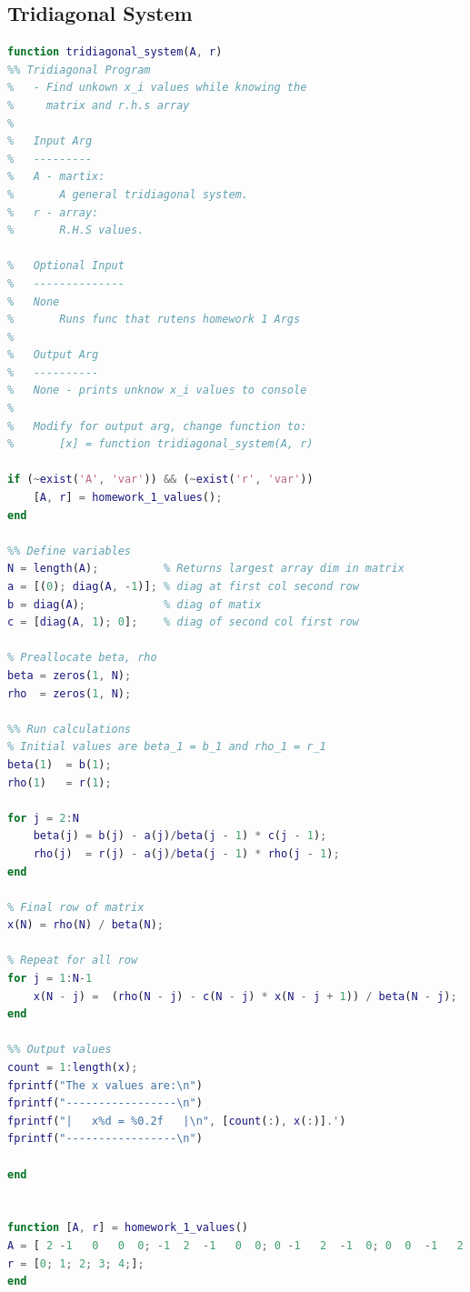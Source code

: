 \documentclass[12pt]{article}
\begin{document}
\subsection*{Tridiagonal System}
\begin{lstlisting}[language=Matlab, caption=Tridiagonal Program]
function tridiagonal_system(A, r)
%% Tridiagonal Program
%   - Find unkown x_i values while knowing the
%     matrix and r.h.s array
%   
%   Input Arg
%   ---------
%   A - martix:
%       A general tridiagonal system.
%   r - array:
%       R.H.S values.

%   Optional Input
%   --------------
%   None
%       Runs func that rutens homework 1 Args
%
%   Output Arg
%   ----------
%   None - prints unknow x_i values to console
%
%   Modify for output arg, change function to:
%       [x] = function tridiagonal_system(A, r)

if (~exist('A', 'var')) && (~exist('r', 'var'))
    [A, r] = homework_1_values(); 
end

%% Define variables   
N = length(A);          % Returns largest array dim in matrix
a = [(0); diag(A, -1)]; % diag at first col second row
b = diag(A);            % diag of matix
c = [diag(A, 1); 0];    % diag of second col first row

% Preallocate beta, rho
beta = zeros(1, N);
rho  = zeros(1, N);

%% Run calculations
% Initial values are beta_1 = b_1 and rho_1 = r_1
beta(1)  = b(1);
rho(1)   = r(1);

for j = 2:N
    beta(j) = b(j) - a(j)/beta(j - 1) * c(j - 1);
    rho(j)  = r(j) - a(j)/beta(j - 1) * rho(j - 1);
end

% Final row of matrix
x(N) = rho(N) / beta(N);

% Repeat for all row
for j = 1:N-1
    x(N - j) =  (rho(N - j) - c(N - j) * x(N - j + 1)) / beta(N - j);
end

%% Output values
count = 1:length(x);
fprintf("The x values are:\n")
fprintf("-----------------\n")
fprintf("|   x%d = %0.2f   |\n", [count(:), x(:)].')
fprintf("-----------------\n")

end


function [A, r] = homework_1_values()
A = [ 2 -1   0   0  0; -1  2  -1   0  0; 0 -1   2  -1  0; 0  0  -1   2 -1; 0  0   0  -1  2;];
r = [0; 1; 2; 3; 4;];
end
\end{lstlisting}
\end{document}
